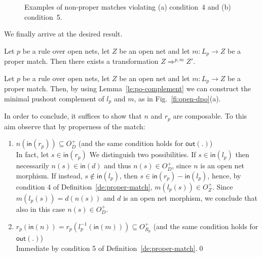 \documentclass{LMCS}
\newcommand{\inp}[1]{\ensuremath{\mathsf{in}({#1})}}
\newcommand{\out}[1]{\ensuremath{\mathsf{out}({#1})}}
\newcommand{\rew}[1]{\Rightarrow^{#1}}
\begin{document}
\begin{figure}
  \hspace{1mm}
  
  \caption{Examples of non-proper matches violating (a) condition~4 
    and (b) condition~5.}

\end{figure}

We finally arrive at the desired result.

\begin{lem}
  \label{le:general-transformation}
  Let $p$ be a rule over open nets, let $Z$ be an open net and
  let $m : L_p \to Z$ be a proper match.
  Then there exists a transformation $Z \rew{p,m} Z'$.
\end{lem}


\proof
  Let $p$ be a rule over open nets, let $Z$ be an open net and
  let $m : L_p \to Z$ be a proper match.
Then, by using Lemma~\ref{le:po-complement} we can construct the minimal
  pushout complement of $l_p$ and $m$, as in Fig.~\ref{fi:open-dpo}(a).
  
  In order to conclude, it suffices to show that $n$ and $r_p$ are
  composable. To this aim observe that by properness of the match:

  \begin{enumerate}[$\bullet$]
    
  \item
    $n(\inp{r_p}) \subseteq O_D^+$ (and the same condition holds for $\out{.}$)\\
    In fact, let $s \in \inp{r_p}$ We distinguish two
    possibilities. If $s \in \inp{l_p}$ then necessarily $n(s) \in
    \inp{d}$ and thus $n(s) \in O_D^+$, since $n$ is an open net
    morphism. If instead, $s \not\in \inp{l_p}$, then $s \in \inp{r_p}
    - \inp{l_p}$, hence, by condition 4 of
    Definition~\ref{de:proper-match}, $m(l_p(s)) \in O_Z^+$. Since
    $m(l_p(s)) = d(n(s))$ and $d$ is an open net morphism, we conclude
    that also in this case $n(s) \in O_D^+$.

  \item
    $r_p(\inp{n}) = r_p(l_p^{-1}(\inp{m})) \subseteq O_{R_p}^+$ (and the same condition holds for $\out{.}$)\\
    Immediate by condition 5 of Definition~\ref{de:proper-match}.\qed
  \end{enumerate}
\end{document}
